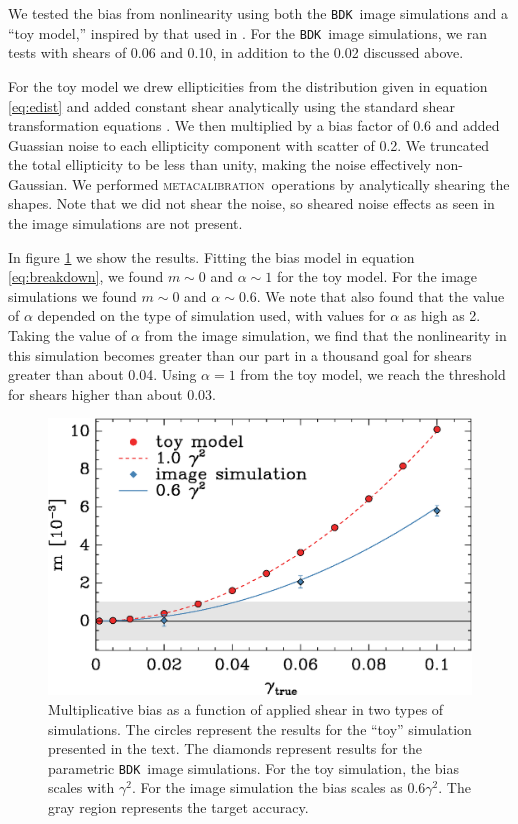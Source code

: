 \documentclass[iop]{emulateapj}
\newcommand{\mcal}{\textsc{metacalibration}}
\newcommand{\bdksim}{\texttt{BDK}}
\begin{document}
We tested the bias from nonlinearity using both the \bdksim\ image
simulations and a ``toy model,'' inspired by that used in \citep{ba14}.
For the \bdksim\ image simulations, we ran tests with shears of
0.06 and 0.10, in addition to the 0.02 discussed above.

For the toy model we drew ellipticities from the distribution given in equation
\ref{eq:edist} and added constant shear analytically using the standard shear
transformation equations \citep{SeitzSchneider97}.  We then multiplied by a
bias factor of 0.6 and added Guassian noise to each ellipticity component with
scatter of 0.2. We truncated the total ellipticity to be less than unity,
making the noise effectively non-Gaussian.  We performed \mcal\ operations by
analytically shearing the shapes.  Note that we did not shear the noise, so
sheared noise effects as seen in the image simulations are not present.

In figure \ref{fig:weaklens} we show the results.  Fitting the bias model in
equation \ref{eq:breakdown}, we found $m \sim 0$ and $\alpha \sim 1$ for the
toy model.  For the image simulations we found $m \sim 0$ and $\alpha \sim
0.6$. We note that \cite{bfd2016} also found that the value of $\alpha$
depended on the type of simulation used, with values for $\alpha$ as high as
2.  Taking the value of $\alpha$ from the image simulation, we find that the
nonlinearity in this simulation becomes greater than our part in a thousand
goal for shears greater than about 0.04.  Using $\alpha=1$ from the toy model,
we reach the threshold for shears higher than about 0.03.

\begin{figure}
	\centering
    \includegraphics[width=\columnwidth]{weaklens-approx.eps}

    \caption{Multiplicative bias as a function of applied shear in two types of
    simulations.  The circles represent the results for the ``toy'' simulation
    presented in the text.  The diamonds represent results for the parametric
    \bdksim\ image simulations.  For the toy simulation, the bias scales with
    $\gamma^2$.  For the image simulation the bias scales as $0.6 \gamma^2$.
    The gray region represents the target accuracy.}

\label{fig:weaklens}
\end{figure}
\end{document}
